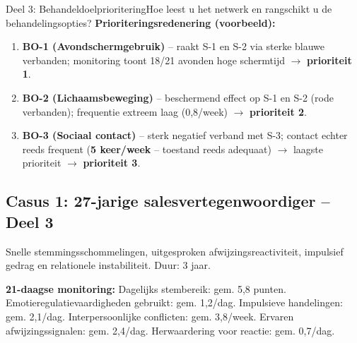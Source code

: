 \documentclass[11pt,a4paper]{article}
\begin{document}
\begin{voorbeeldbox}{Deel 3: Behandeldoelprioritering}{Hoe leest u het netwerk en rangschikt u de behandelingsopties?}
\medskip
\textbf{Prioriteringsredenering (voorbeeld):}
\begin{enumerate}[topsep=2pt,itemsep=1pt,label=\arabic*.]
\item \textbf{BO-1 (Avondschermgebruik)} -- raakt S-1 en S-2 via sterke blauwe verbanden;
monitoring toont 18/21 avonden hoge schermtijd $\rightarrow$ \textbf{prioriteit 1}.
\item \textbf{BO-2 (Lichaamsbeweging)} -- beschermend effect op S-1 en S-2 (rode verbanden);
frequentie extreem laag (0,8/week) $\rightarrow$ \textbf{prioriteit 2}.
\item \textbf{BO-3 (Sociaal contact)} -- sterk negatief verband met S-3; contact echter reeds frequent (\textbf{5 keer/week} -- toestand reeds adequaat) $\rightarrow$ laagste prioriteit $\rightarrow$ \textbf{prioriteit 3}.
\end{enumerate}
\end{voorbeeldbox}

\vspace{0.5em}

\newpage
\subsection*{Casus 1: 27-jarige salesvertegenwoordiger -- Deel 3}

\begin{complaintbox}[title={Casus 1: 27-jarige salesvertegenwoordiger}]
\small Snelle stemmingsschommelingen, uitgesproken afwijzingsreactiviteit, impulsief gedrag en relationele instabiliteit. Duur: 3 jaar.
\end{complaintbox}

\begin{monitorbox}
\small\textbf{21-daagse monitoring:} Dagelijks stembereik: gem. 5,8 punten. Emotieregulatievaardigheden gebruikt: gem. 1,2/dag. Impulsieve handelingen: gem. 2,1/dag. Interpersoonlijke conflicten: gem. 3,8/week. Ervaren afwijzingssignalen: gem. 2,4/dag. Herwaardering voor reactie: gem. 0,7/dag.
\end{monitorbox}
\end{document}
